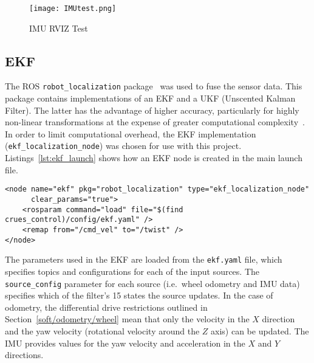 \begin{figure}[!ht]
	\centering
	\texttt{[image: IMUtest.png]}
	\caption{IMU RVIZ Test}\label{fig:imu_test}
\end{figure}

\subsection{EKF}\label{soft/odometry/ekf}

The ROS \verb|robot_localization| package~\cite{RosRobotLocalization} was used
to fuse the sensor data. This package contains implementations of
an EKF and a UKF (Unscented Kalman Filter). The latter has the advantage of higher
accuracy, particularly for highly non-linear transformations at the expense of
greater computational complexity~\cite{wan_unscented_2000}. In order to limit
computational overhead, the EKF implementation (\verb|ekf_localization_node|) was
chosen for use with this project. Listings~\ref{lst:ekf_launch} shows how an EKF
node is created in the main launch file.


\begin{lstlisting}[caption={EKF node in ROS launch file}, label={lst:ekf_launch}, style=xml]
<node name="ekf" pkg="robot_localization" type="ekf_localization_node"
      clear_params="true">
    <rosparam command="load" file="$(find crues_control)/config/ekf.yaml" />
    <remap from="/cmd_vel" to="/twist" />
</node>
\end{lstlisting}

The parameters used in the EKF are loaded from the \verb|ekf.yaml| file, which
specifies topics and configurations for each of the input sources. The
\verb|source_config| parameter for each source (i.e.\ wheel odometry and IMU data)
specifies which of the filter's 15 states the source updates. In the case of
odometry, the differential drive restrictions outlined in
Section~\ref{soft/odometry/wheel} mean that only the velocity in the $X$ direction
and the yaw velocity (rotational velocity around the $Z$ axis) can be updated.
The IMU provides values for the yaw velocity and acceleration in the $X$ and
$Y$ directions.

